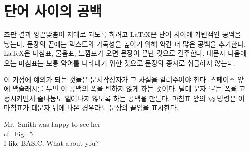 \section{단어 사이의 공백}

조판 결과 양끝맞춤이 제대로 되도록 하려고 \LaTeX 은 단어 사이에 가변적인 공백을 넣는다.
문장의 끝에는 텍스트의 가독성을 높이기 위해 약간 더 많은 공백을 추가한다.
\LaTeX 은 마침표, 물음표, 느낌표가 오면 문장이 끝난 것으로 간주한다. 대문자 다음에 오는 
마침표는 보통 약어를 나타내기 위한 것으로 문장의 종지로 취급하지 않는다.

이 가정에 예외가 되는 것들은 문서작성자가 그 사실을 알려주어야 한다. 스페이스 앞에 
백슬래시를 두면 이 공백의 폭을 변하지 않게 하는 것이다. 틸데 문자 `\verb|~|'는 
폭을 고정시키면서 줄나눔도 일어나지 않도록 하는 공백을 만든다.
마침표 앞의 \verb|\@| 명령은 이 마침표가 대문자 뒤에 나온 경우라도 문장의 끝임을 표시한다.
  

\begin{example}
Mr.~Smith was happy to see her\\
cf.~Fig.~5\\
I like BASIC\@. What about you?
\end{example}

